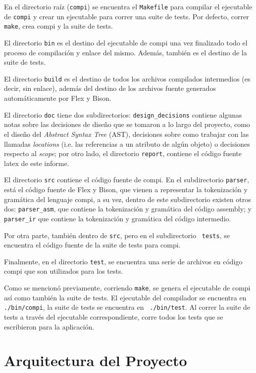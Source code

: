 \documentclass[12pt, a4paper, titlepage]{article}
\begin{document}
  En el directorio raíz ({\tt compi}) se encuentra el {\tt Makefile} para
  compilar el ejecutable de {\tt compi} y crear un ejecutable para correr una
  suite de tests. Por defecto, correr {\tt make}, crea compi y la suite de
  tests.

  El directorio {\tt bin} es el destino del ejecutable de {\sc compi} una vez
  finalizado todo el proceso de compilación y enlace del mismo. Además, también
  es el destino de la suite de tests.

  El directorio {\tt build} es el destino de todos los archivos compilados
  intermedios (es decir, sin enlace), además del destino de los archivos fuente
  generados automáticamente por Flex y Bison.

  El directorio {\tt doc} tiene dos subdirectorios: {\tt design\_decisions}
  contiene algunas notas sobre las decisiones de diseño que se tomaron a lo
  largo del proyecto, como el diseño del {\em Abstract Syntax Tree} (AST),
  decisiones sobre como trabajar con las llamadas {\em locations} (i.e. las
  referencias a un atributo de algún objeto) o decisiones respecto al {\em
  scope}; por otro lado, el directorio {\tt report}, contiene el código fuente
  latex de este informe.

  El directorio {\tt src} contiene el código fuente de {\sc compi}. En el
  subdirectorio {\tt parser}, está el código fuente de Flex y Bison, que vienen
  a representar la tokenización y gramática del lenguaje compi, a su vez, dentro
  de este subdirectorio existen otros dos: {\tt parser\_asm}, que contiene la
  tokenización y gramática del código assembly; y {\tt parser\_ir} que contiene
  la tokenización y gramática del código intermedio.

  Por otra parte, también dentro de {\tt src}, pero en el subdirectorio {\tt
  tests}, se encuentra el código fuente de la suite de tests para {\sc compi}.

  Finalmente, en el directorio {\tt test}, se encuentra una serie de archivos en
  código {\sc compi} que son utilizados para los tests.

  Como se mencionó previamente, corriendo {\tt make}, se genera el ejecutable de
  {\sc compi} así como también la suite de tests. El ejecutable del compilador
  se encuentra en {\tt ./bin/compi}, la suite de tests se encuentra en {\tt
  ./bin/test}. Al correr la suite de tests a través del ejecutable
  correspondiente, corre todos los tests que se escribieron para la aplicación.

  \section{Arquitectura del Proyecto}\label{sec:architecture}
\end{document}
